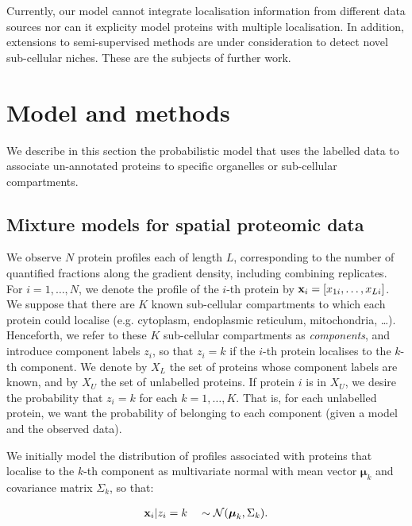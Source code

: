 \documentclass[12pt,english]{article}\usepackage[]{graphicx}\usepackage[]{color}
\begin{document}
\bigskip

Currently, our model cannot integrate localisation information from
different data sources nor can it explicity model proteins with
multiple localisation. In addition, extensions to semi-supervised
methods are under consideration to detect novel sub-cellular
niches. These are the subjects of further work.

\bigskip

\section{Model and methods}\label{section:methods}

We describe in this section the probabilistic model that uses the
labelled data to associate un-annotated proteins to specific
organelles or sub-cellular compartments.

\subsection{Mixture models for spatial proteomic data}

We observe $N$ protein profiles each of length $L$, corresponding to
the number of quantified fractions along the gradient density,
including combining replicates.  For $i = 1, \ldots, N$, we denote the
profile of the $i$-th protein by
${\bf x}_i = [x_{1i}, \ldots, x_{Li}]$.  We suppose that there are $K$
known sub-cellular compartments to which each protein could localise
(e.g. cytoplasm, endoplasmic reticulum, mitochondria, \ldots).
Henceforth, we refer to these $K$ sub-cellular compartments as {\em
  components}, and introduce component labels $z_i$, so that $z_i = k$
if the $i$-th protein localises to the $k$-th component. We denote by
$X_L$ the set of proteins whose component labels are known, and by
$X_U$ the set of unlabelled proteins.  If protein $i$ is in $X_U$, we
desire the probability that $z_i = k$ for each $k = 1, \ldots, K$.
That is, for each unlabelled protein, we want the probability of
belonging to each component (given a model and the observed data).


We initially model the distribution of profiles associated with
proteins that localise to the $k$-th component as multivariate normal
with mean vector $\boldsymbol{\mu}_k$ and covariance matrix
$\Sigma_k$, so that:

\begin{align}
{\bf x}_i | z_i = k \quad \sim \mathcal{N}(\boldsymbol{\mu}_k, \Sigma_k). \label{equation::preq}
\end{align}
\end{document}
